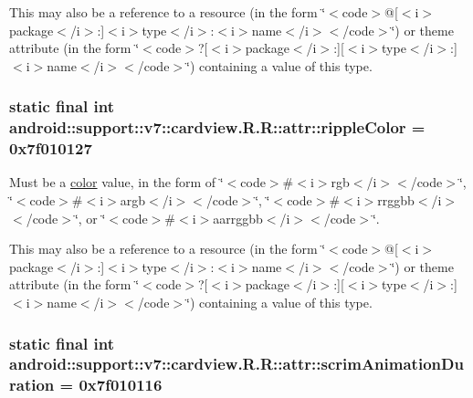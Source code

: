 This may also be a reference to a resource (in the form \char`\"{}$<$code$>$@\mbox{[}$<$i$>$package$<$/i$>$:\mbox{]}$<$i$>$type$<$/i$>$:$<$i$>$name$<$/i$>$$<$/code$>$\char`\"{}) or theme attribute (in the form \char`\"{}$<$code$>$?\mbox{[}$<$i$>$package$<$/i$>$:\mbox{]}\mbox{[}$<$i$>$type$<$/i$>$:\mbox{]}$<$i$>$name$<$/i$>$$<$/code$>$\char`\"{}) containing a value of this type. \hypertarget{classandroid_1_1support_1_1v7_1_1cardview_1_1_r_1_1attr_05b0ba92e87e0a21e01ff5b25d379da6}{
\subsubsection[{rippleColor}]{\setlength{\rightskip}{0pt plus 5cm}static final int android::support::v7::cardview.R.R::attr::rippleColor = 0x7f010127}}
\label{classandroid_1_1support_1_1v7_1_1cardview_1_1_r_1_1attr_05b0ba92e87e0a21e01ff5b25d379da6}


Must be a \hyperlink{classandroid_1_1support_1_1v7_1_1cardview_1_1_r_1_1color}{color} value, in the form of \char`\"{}$<$code$>$\#$<$i$>$rgb$<$/i$>$$<$/code$>$\char`\"{}, \char`\"{}$<$code$>$\#$<$i$>$argb$<$/i$>$$<$/code$>$\char`\"{}, \char`\"{}$<$code$>$\#$<$i$>$rrggbb$<$/i$>$$<$/code$>$\char`\"{}, or \char`\"{}$<$code$>$\#$<$i$>$aarrggbb$<$/i$>$$<$/code$>$\char`\"{}. 

This may also be a reference to a resource (in the form \char`\"{}$<$code$>$@\mbox{[}$<$i$>$package$<$/i$>$:\mbox{]}$<$i$>$type$<$/i$>$:$<$i$>$name$<$/i$>$$<$/code$>$\char`\"{}) or theme attribute (in the form \char`\"{}$<$code$>$?\mbox{[}$<$i$>$package$<$/i$>$:\mbox{]}\mbox{[}$<$i$>$type$<$/i$>$:\mbox{]}$<$i$>$name$<$/i$>$$<$/code$>$\char`\"{}) containing a value of this type. \hypertarget{classandroid_1_1support_1_1v7_1_1cardview_1_1_r_1_1attr_35c23ea8f78075ae353978e0c8e67a6a}{
\subsubsection[{scrimAnimationDuration}]{\setlength{\rightskip}{0pt plus 5cm}static final int android::support::v7::cardview.R.R::attr::scrimAnimationDuration = 0x7f010116}}
\label{classandroid_1_1support_1_1v7_1_1cardview_1_1_r_1_1attr_35c23ea8f78075ae353978e0c8e67a6a}


